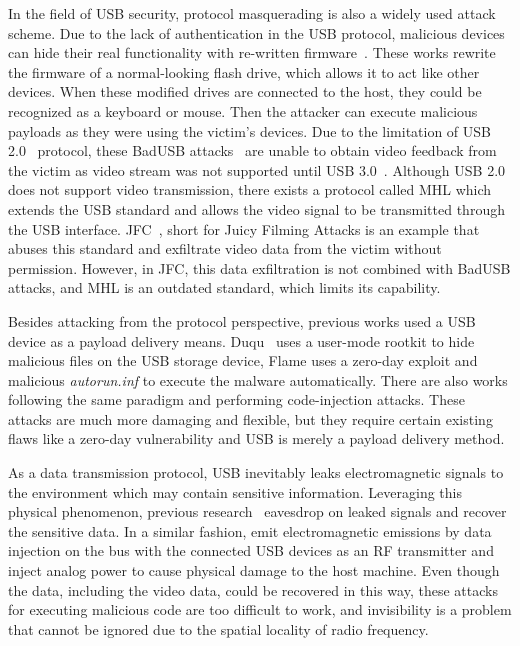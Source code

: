 In the field of \ac{USB} security, protocol masquerading is also a widely used
attack scheme. Due to the lack of authentication in the \ac{USB} protocol, malicious
devices can hide their real functionality with re-written
firmware~\cite{rubber,badusb,rubberducky2020,usbbypassing,iseeyou,usbdriver}.
These works rewrite the firmware of a normal-looking flash drive, which allows
it to act like other devices. When these modified drives are connected to the
host, they could be recognized as a keyboard or mouse. Then the attacker can
execute malicious payloads as they were using the victim's devices. Due to the
limitation of \ac{USB} 2.0~\cite{usb20} protocol, these BadUSB
attacks~\cite{badusb} are unable to obtain video feedback from the victim
as video stream was not supported until \ac{USB} 3.0~\cite{usb30}. Although \ac{USB} 2.0 does not
support video transmission, there exists a protocol called \ac{MHL} which extends the \ac{USB} standard and allows the video signal to
be transmitted through the \ac{USB} interface. JFC~\cite{JFC}, short for Juicy Filming Attacks is an example that abuses this standard and exfiltrate video data
from the victim without permission. However, in JFC, this data exfiltration is not
combined with BadUSB attacks, and \ac{MHL} is an outdated standard, which limits its
capability.

Besides attacking from the protocol perspective, previous works used a
\ac{USB} device as a payload delivery means. Duqu~\cite{duqu} uses a user-mode
rootkit to hide malicious files on the \ac{USB} storage device, Flame\cite{flame} uses a
zero-day exploit and malicious \textit{autorun.inf} to execute the malware
automatically. There are also works \cite{brain,stuxnet,conficker}
following the same paradigm and performing code-injection attacks. These
attacks are much more damaging and flexible,
but they require certain existing flaws like a zero-day vulnerability\cite{zero-day}  and \ac{USB} is merely
a payload delivery method.

As a data transmission protocol, \ac{USB} inevitably leaks electromagnetic signals
to the environment which may contain sensitive information. Leveraging this
physical phenomenon, previous research~\cite{smartphone,
poweremi,revealing,su2017usb,usbgpslocator,bates2014leveraging,badusbhub,usbfinger,side,usbdriver}
eavesdrop on leaked signals and recover the sensitive data. In a similar fashion,
\cite{usbee,turnip} emit electromagnetic emissions by data injection on the bus
with the connected \ac{USB} devices as an RF transmitter and \cite{usbkiller,cable}
inject analog
power to cause physical damage to the host machine. Even though the data,
including the video data, could be recovered in this way, these attacks for
executing malicious code are too difficult to work, and invisibility is a
problem that cannot be ignored due to the spatial locality of radio frequency.

